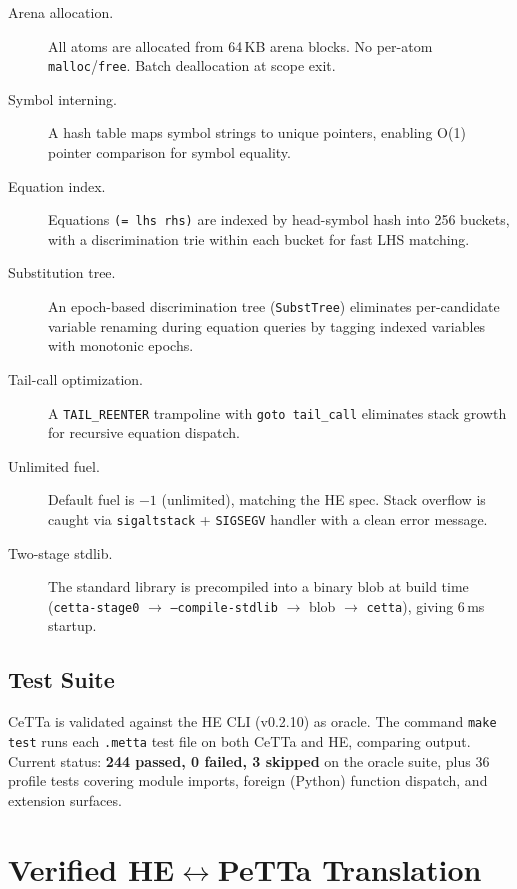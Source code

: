 \documentclass[11pt]{article}
\newcommand{\code}[1]{\texttt{#1}}
\newcommand{\PeTTa}{\textup{PeTTa}}
\newcommand{\HE}{\textup{HE}}
\newcommand{\CeTTa}{\textup{CeTTa}}
\begin{document}
\begin{description}
\item[Arena allocation.] All atoms are allocated from 64\,KB arena blocks.
  No per-atom \code{malloc}/\code{free}.  Batch deallocation at scope exit.
\item[Symbol interning.] A hash table maps symbol strings to unique
  pointers, enabling O(1) pointer comparison for symbol equality.
\item[Equation index.] Equations \code{(= lhs rhs)} are indexed by
  head-symbol hash into 256 buckets, with a discrimination trie within
  each bucket for fast LHS matching.
\item[Substitution tree.] An epoch-based discrimination tree
  (\code{SubstTree}) eliminates per-candidate variable renaming during
  equation queries by tagging indexed variables with monotonic epochs.
\item[Tail-call optimization.] A \code{TAIL\_REENTER} trampoline with
  \code{goto tail\_call} eliminates stack growth for recursive equation
  dispatch.
\item[Unlimited fuel.] Default fuel is $-1$ (unlimited), matching the
  \HE{} spec.  Stack overflow is caught via \code{sigaltstack} +
  \code{SIGSEGV} handler with a clean error message.
\item[Two-stage stdlib.] The standard library is precompiled into a
  binary blob at build time (\code{cetta-stage0} $\to$
  \code{--compile-stdlib} $\to$ blob $\to$ \code{cetta}), giving 6\,ms
  startup.
\end{description}

\subsection{Test Suite}

\CeTTa{} is validated against the \HE{} CLI (v0.2.10) as oracle.
The command \code{make test} runs each \code{.metta} test file on both
\CeTTa{} and \HE{}, comparing output.  Current status: \textbf{244
passed, 0 failed, 3 skipped} on the oracle suite, plus 36 profile
tests covering module imports, foreign (Python) function dispatch,
and extension surfaces.

\section{Verified \HE{}$\leftrightarrow$\PeTTa{} Translation}
\end{document}
